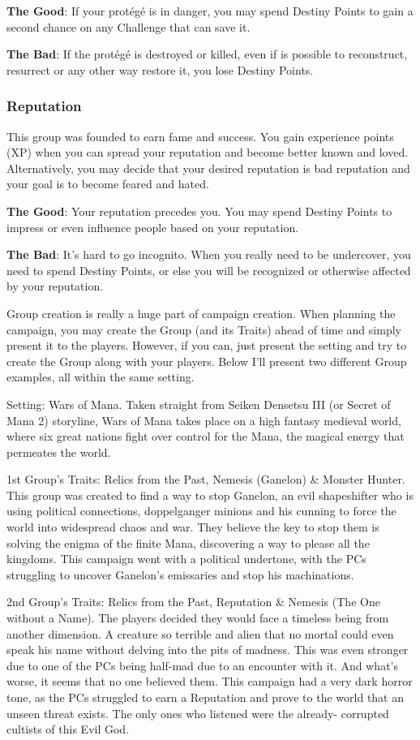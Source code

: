 \begin{multicols}{2}
\textbf{The Good}: If your protégé is in danger, you
may spend Destiny Points to gain a second chance
on any Challenge that can save it.

\textbf{The Bad}: If the protégé is destroyed or
killed, even if is possible to reconstruct, resurrect
or any other way restore it, you lose Destiny Points.

\subsubsection{Reputation}
This group was founded to earn fame and
success. You gain experience points (XP) when you
can spread your reputation and become better
known and loved. Alternatively, you may decide
that your desired reputation is bad reputation and
your goal is to become feared and hated.

\textbf{The Good}: Your reputation precedes you.
You may spend Destiny Points to impress or even
influence people based on your reputation.

\textbf{The Bad}: It's hard to go incognito. When
you really need to be undercover, you need to
spend Destiny Points, or else you will be
recognized or otherwise affected by your
reputation.

Group creation is really a huge part of campaign
creation. When planning the campaign, you may create
the Group (and its Traits) ahead of time and simply
present it to the players. However, if you can, just present
the setting and try to create the Group along with your
players. Below I'll present two different Group examples,
all within the same setting.

Setting: Wars of Mana. Taken straight from Seiken
Densetsu III (or Secret of Mana 2) storyline, Wars of
Mana takes place on a high fantasy medieval world, where
six great nations fight over control for the Mana, the
magical energy that permeates the world.

1st Group's Traits: Relics from the Past, Nemesis
(Ganelon) \& Monster Hunter. This group was created to
find a way to stop Ganelon, an evil shapeshifter who is
using political connections, doppelganger minions and his
cunning to force the world into widespread chaos and war.
They believe the key to stop them is solving the enigma
of the finite Mana, discovering a way to please all the
kingdoms. This campaign went with a political undertone,
with the PCs struggling to uncover Ganelon's emissaries
and stop his machinations.

2nd Group's Traits: Relics from the Past, Reputation
\& Nemesis (The One without a Name). The players
decided they would face a timeless being from another
dimension. A creature so terrible and alien that no mortal
could even speak his name without delving into the pits
of madness. This was even stronger due to one of the PCs
being half-mad due to an encounter with it. And what’s
worse, it seems that no one believed them. This campaign
had a very dark horror tone, as the PCs struggled to earn
a Reputation and prove to the world that an unseen threat
exists. The only ones who listened were the already-
corrupted cultists of this Evil God.
\end{multicols}

